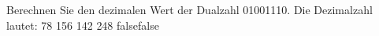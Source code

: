     {Berechnen Sie den dezimalen Wert der Dualzahl 01001110. Die Dezimalzahl lautet:}
    {78}
    {156}
    {142}
    {248}
    {false}{false}